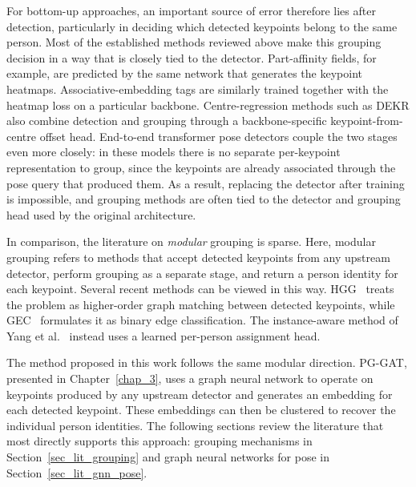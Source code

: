 For bottom-up approaches, an important source of error therefore lies after detection,
particularly in deciding which detected keypoints belong to the same person.
Most of the established methods reviewed above
make this grouping decision in a way that is closely tied to the detector.
Part-affinity fields, for example, are predicted by the same network that generates the keypoint heatmaps.
Associative-embedding tags are similarly trained together with the heatmap loss on a particular backbone.
Centre-regression methods such as DEKR also combine detection and grouping
through a backbone-specific keypoint-from-centre offset head.
End-to-end transformer pose detectors couple the two stages even more closely:
in these models there is no separate per-keypoint representation to group,
since the keypoints are already associated through the pose query that produced them.
As a result, replacing the detector after training is impossible,
and grouping methods are often tied to the detector and grouping head used by the original architecture.

In comparison, the literature on \emph{modular} grouping is sparse.
Here, modular grouping refers to methods that accept detected keypoints from any upstream detector,
perform grouping as a separate stage,
and return a person identity for each keypoint.
Several recent methods can be viewed in this way.
HGG~\cite{jin2020hgg} treats the problem as higher-order graph matching between detected keypoints,
while GEC~\cite{maher2025gec} formulates it as binary edge classification.
The instance-aware method of Yang et al.~\cite{yang2023instanceaware}
instead uses a learned per-person assignment head.

The method proposed in this work follows the same modular direction.
PG-GAT, presented in Chapter~\ref{chap_3},
uses a graph neural network to operate on keypoints produced by any upstream detector
and generates an embedding for each detected keypoint.
These embeddings can then be clustered to recover the individual person identities.
The following sections review the literature that most directly supports this approach:
grouping mechanisms in Section~\ref{sec_lit_grouping}
and graph neural networks for pose in Section~\ref{sec_lit_gnn_pose}.